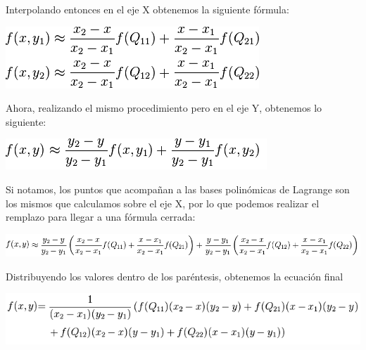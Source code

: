 Interpolando entonces en el eje X obtenemos la siguiente fórmula:

\begin{center}
\includegraphics[scale=0.75]{imagenes/bilinealX.png}\\
\end{center}


Ahora, realizando el mismo procedimiento pero en el eje Y, obtenemos lo siguiente:

\begin{center}
\includegraphics[scale=0.75]{imagenes/bilinealY.png}\\
\end{center}

Si notamos, los puntos que acompañan a las bases polinómicas de Lagrange son los mismos que calculamos sobre el eje X, por lo que podemos realizar el remplazo para llegar a una fórmula cerrada:

\begin{center}
\includegraphics[scale=0.75]{imagenes/bilinealXY.png}\\
\end{center}

Distribuyendo los valores dentro de los paréntesis, obtenemos la ecuación final

\begin{center}
\includegraphics[scale=0.75]{imagenes/bilinealFinal.png}\\
\end{center}

